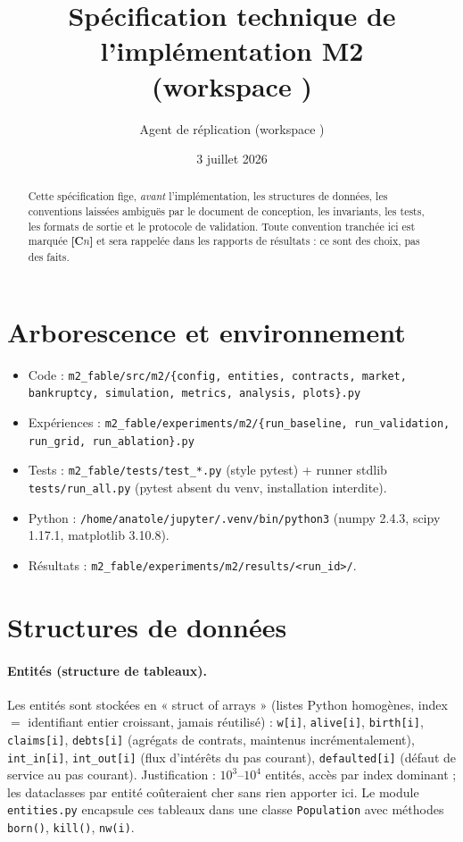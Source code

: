 \documentclass[11pt,a4paper]{article}
\title{Spécification technique de l'implémentation M2\\
\large (workspace \code{m2\_fable})}
\author{Agent de réplication (workspace \code{m2\_fable})}
\date{3 juillet 2026}
\newcommand{\code}[1]{\texttt{#1}}
\begin{document}
\maketitle

\begin{abstract}
Cette spécification fige, \emph{avant} l'implémentation, les structures de
données, les conventions laissées ambiguës par le document de conception, les
invariants, les tests, les formats de sortie et le protocole de validation.
Toute convention tranchée ici est marquée \textbf{[C$n$]} et sera rappelée
dans les rapports de résultats : ce sont des choix, pas des faits.
\end{abstract}

\section{Arborescence et environnement}

\begin{itemize}[nosep]
\item Code : \code{m2\_fable/src/m2/\{config, entities, contracts, market,
  bankruptcy, simulation, metrics, analysis, plots\}.py}
\item Expériences : \code{m2\_fable/experiments/m2/\{run\_baseline,
  run\_validation, run\_grid, run\_ablation\}.py}
\item Tests : \code{m2\_fable/tests/test\_*.py} (style pytest) + runner
  stdlib \code{tests/run\_all.py} (pytest absent du venv, installation
  interdite).
\item Python : \code{/home/anatole/jupyter/.venv/bin/python3}
  (numpy 2.4.3, scipy 1.17.1, matplotlib 3.10.8).
\item Résultats : \code{m2\_fable/experiments/m2/results/<run\_id>/}.
\end{itemize}

\section{Structures de données}

\paragraph{Entités (structure de tableaux).} Les entités sont stockées en
« struct of arrays » (listes Python homogènes, index $=$ identifiant entier
croissant, jamais réutilisé) :
\code{w[i]}, \code{alive[i]}, \code{birth[i]}, \code{claims[i]},
\code{debts[i]} (agrégats de contrats, maintenus incrémentalement),
\code{int\_in[i]}, \code{int\_out[i]} (flux d'intérêts du pas courant),
\code{defaulted[i]} (défaut de service au pas courant).
Justification : $10^3$--$10^4$ entités, accès par index dominant ; les
dataclasses par entité coûteraient cher sans rien apporter ici. Le module
\code{entities.py} encapsule ces tableaux dans une classe \code{Population}
avec méthodes \code{born()}, \code{kill()}, \code{nw(i)}.
\end{document}
